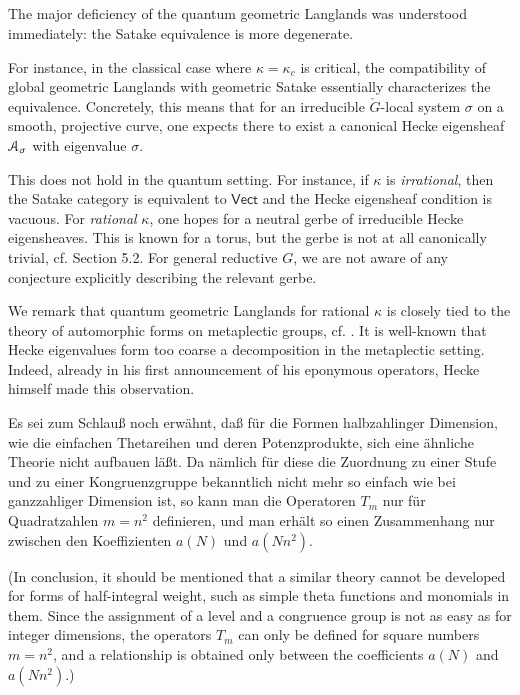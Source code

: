 \documentclass[11pt,reqno]{amsart}
\theoremstyle{remark}
\numberwithin{equation}{section}
\newcommand{\Vect}{\mathsf{Vect}}
\begin{document}
\subsection{} 

The major deficiency of the quantum geometric Langlands was 
understood immediately:
the Satake equivalence is more degenerate. 

For instance, in the classical case where 
$\kappa = \kappa_c$ is critical, 
the compatibility of global geometric Langlands
with geometric Satake essentially characterizes the equivalence.
Concretely, this means that for an 
irreducible $\check{G}$-local system $\sigma$
on a smooth, projective curve, one expects there to exist
a canonical Hecke eigensheaf $\EuScript{A}_{\sigma}$ with
eigenvalue $\sigma$.

This does not hold in the quantum setting. For instance,
if $\kappa$ is \emph{irrational},
then the Satake category is equivalent to 
$\Vect$ and the Hecke eigensheaf condition is vacuous. 
For \emph{rational} $\kappa$, 
one hopes for a neutral
gerbe of irreducible Hecke eigensheaves. This is known
for a torus, but the gerbe is 
not at all canonically trivial, cf. 
\cite{lysenko-torus} Section 5.2. For general reductive 
$G$, we are not aware of any conjecture explicitly 
describing the relevant gerbe.

We remark that quantum geometric Langlands for rational $\kappa$ is 
closely tied to the theory of 
automorphic forms on metaplectic groups, 
cf. \cite{gaitsgory-lysenko}. 
It is well-known that 
Hecke eigenvalues form too coarse a decomposition
in the metaplectic setting. Indeed, already 
in his first announcement \cite{hecke-announcement}
of his eponymous operators,
Hecke himself made this observation.

\begin{displayquote}
\vspace{.1cm}
{\it

Es sei zum Schlau\ss{} noch erw\"ahnt, da\ss{} f\"ur die Formen halbzahlinger Dimension, wie 
die einfachen Thetareihen und deren Potenzprodukte, sich eine \"ahnliche Theorie 
nicht aufbauen l\"a\ss{t}.
Da n\"amlich f\"ur diese die Zuordnung zu einer Stufe und zu einer Kongruenzgruppe 
bekanntlich nicht mehr so einfach wie bei ganzzahliger Dimension ist, so kann 
man die Operatoren $T_m$ nur f\"ur Quadratzahlen 
$m=n^2$ definieren, und man erh\"alt so 
einen Zusammenhang nur zwischen den Koeffizienten $a(N)$ und $a(Nn^2)$.

(In conclusion, it should be mentioned that a similar theory cannot be 
developed for forms of half-integral weight, 
such as simple theta functions and monomials in them. 
Since the assignment of a level and a congruence group is not
as easy as for integer dimensions, 
the operators $T_m$ can only be defined 
for square numbers $m = n ^ 2$, 
and a relationship is obtained only between the 
coefficients $a (N)$ and $a (Nn^2)$.)}

\vspace{.1cm}

\end{displayquote}
\end{document}
